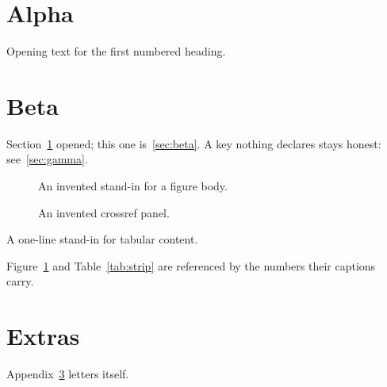 \documentclass{article}
\begin{document}
\section{Alpha}
\label{sec:alpha}
Opening text for the first numbered heading.

\section{Beta}
\label{sec:beta}
Section~\ref{sec:alpha} opened; this one is~\eqref{sec:beta}.
A key nothing declares stays honest: see~\ref{sec:gamma}.

\begin{figure}
An invented stand-in for a figure body.
\caption{An invented crossref panel.}
\label{fig:panel}
\end{figure}

\begin{table}
A one-line stand-in for tabular content.
\caption{An invented data strip.}
\label{tab:strip}
\end{table}

Figure~\ref{fig:panel} and Table~\ref{tab:strip} are referenced by the
numbers their captions carry.

\appendix
\section{Extras}
\label{sec:extras}
Appendix~\ref{sec:extras} letters itself.
\end{document}
